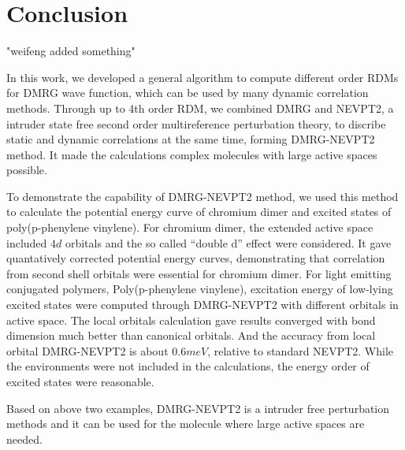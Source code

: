 
\section{Conclusion}

"weifeng added something"

In this work, we developed a general algorithm to compute different order RDMs for DMRG wave function, which can be used by many dynamic correlation methods. 
Through up to 4th order RDM, we combined DMRG and NEVPT2, a intruder state free second order multireference perturbation theory,
to discribe static and dynamic correlations at the same time, forming DMRG-NEVPT2 method. It made the calculations complex molecules with large active spaces possible. 

To demonstrate the capability of DMRG-NEVPT2 method, we used this method to calculate the potential energy curve of chromium dimer and excited 
states of poly(p-phenylene vinylene). For chromium dimer, the extended active space included $4d$ orbitals and the so called ``double d'' effect 
were considered. It gave quantatively corrected potential energy curves, demonstrating that correlation from second shell orbitals were essential for chromium dimer.
For light emitting conjugated polymers, Poly(p-phenylene vinylene), excitation energy of low-lying excited states were computed through DMRG-NEVPT2 
with different orbitals in active space. The local orbitals calculation gave results converged with bond dimension much better than canonical 
orbitals. And the accuracy from local orbital DMRG-NEVPT2 is about $0.6meV$, relative to standard NEVPT2. While the environments were not included 
in the calculations, the energy order of excited states were reasonable.

Based on above two examples, DMRG-NEVPT2 is a intruder free perturbation methods and it can be used for the molecule where large active spaces are needed.
